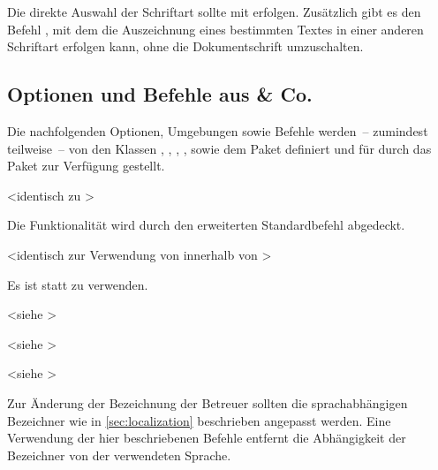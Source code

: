 \begin{DeclareEntity}{}
\begin{Declaration}
Die direkte Auswahl der Schriftart sollte mit  erfolgen. 
Zusätzlich gibt es den Befehl , mit dem die Auszeichnung 
eines bestimmten Textes in einer anderen Schriftart erfolgen kann, ohne die 
Dokumentschrift umzuschalten.
\end{Declaration}
%



\subsection{Optionen und Befehle aus  \& Co.}

Die nachfolgenden Optionen, Umgebungen sowie Befehle werden~-- zumindest 
teilweise~-- von den Klassen , , 
, ,  sowie dem Paket 
 definiert und für \vTUDScript*{\TUDScript} durch das 
Paket  zur Verfügung gestellt.

\begin{Declaration}
  {}
  <identisch zu >
\printdeclarationlist

Die Funktionalität wird durch den erweiterten Standardbefehl  
abgedeckt.
\end{Declaration}

\begin{Declaration}
  {}
  <identisch zur Verwendung von  innerhalb von >
\printdeclarationlist

Es ist 
statt  zu verwenden.
\end{Declaration}

\begin{Declaration}
  {}
  <siehe >
\begin{Declaration}
  {}
  <siehe >
\begin{Declaration}
  {}
  <siehe >
\printdeclarationlist

Zur Änderung der Bezeichnung der Betreuer sollten die sprachabhängigen 
Bezeichner wie in \autoref{sec:localization} beschrieben angepasst werden. Eine 
Verwendung der hier beschriebenen Befehle entfernt die Abhängigkeit der 
Bezeichner von der verwendeten Sprache.
\end{Declaration}
\end{Declaration}
\end{Declaration}


\end{DeclareEntity}
